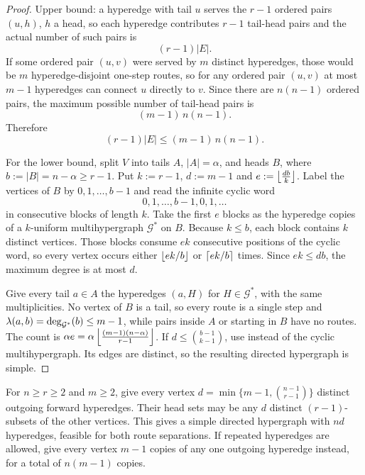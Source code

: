 \begin{proof}
Upper bound: a hyperedge with tail $u$ serves the $r-1$ ordered pairs
$(u, h)$, $h$ a head, so each hyperedge contributes $r-1$ tail-head pairs and
the actual number of such pairs is
\[
    (r-1)|E|.
\]
If some ordered pair $(u, v)$ were served by $m$ distinct hyperedges, those
would be $m$ hyperedge-disjoint one-step routes, so for any ordered pair
$(u,v)$ at most $m-1$ hyperedges can connect $u$ directly to $v$. Since there
are $n(n-1)$ ordered pairs, the maximum possible number of tail-head pairs is
\[
    (m-1)\,n(n-1).
\]
Therefore
\[
    (r-1)|E| \le (m-1)\,n(n-1).
\]

For the lower bound, split $V$ into tails $A$, $|A|=\alpha$, and heads $B$,
where $b:=|B|=n-\alpha\ge r-1$. Put $k:=r-1$, $d:=m-1$ and
$e:=\left\lfloor \frac{db}{k} \right\rfloor$. Label the vertices of $B$ by $0,1,\dots,b-1$ and read
the infinite cyclic word
\[
    0,1,\dots,b-1,0,1,\dots
\]
in consecutive blocks of length $k$. Take the first $e$ blocks as the
hyperedge copies of a $k$-uniform multihypergraph $\mathcal G^*$ on $B$.
Because $k\le b$, each block contains $k$ distinct vertices. Those blocks
consume $ek$ consecutive positions of the cyclic word, so every vertex occurs
either $\left\lfloor ek/b \right\rfloor$ or $\left\lceil ek/b \right\rceil$ times. Since $ek\le db$, the maximum
degree is at most $d$.

Give every tail $a\in A$ the hyperedges $(a,H)$ for $H\in\mathcal G^*$, with
the same multiplicities. No vertex of $B$ is a tail, so every route is a single
step and $\lambda(a,b)=\deg_{\mathcal G^*}(b)\le m-1$, while pairs inside $A$ or
starting in $B$ have no routes. The count is
$\alpha e=\alpha\left\lfloor \frac{(m-1)(n-\alpha)}{r-1} \right\rfloor$. If
$d\le\binom{b-1}{k-1}$, use  instead of the cyclic
multihypergraph. Its edges are distinct, so the resulting directed hypergraph
is simple.
\end{proof}

\begin{construction}\label{const:bounded-outdegree-hyper}
For $n\ge r\ge2$ and $m\ge2$, give every vertex
$d=\min\{m-1,\binom{n-1}{r-1}\}$ distinct outgoing forward hyperedges.
Their head sets may be any $d$ distinct $(r-1)$-subsets of the other vertices.
This gives a simple directed hypergraph with $nd$ hyperedges, feasible for
both route separations. If repeated hyperedges are allowed, give every
vertex $m-1$ copies of any one outgoing hyperedge instead, for a total of
$n(m-1)$ copies.
\end{construction}

